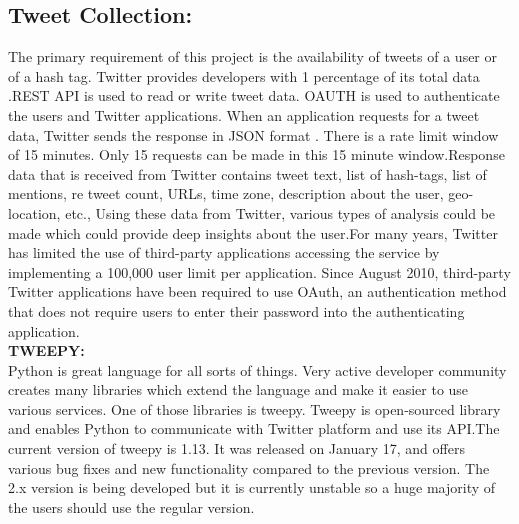 \subsection{Tweet Collection:}
The primary requirement of this project is the availability of tweets of a user or of a hash tag. Twitter provides developers with 1 percentage of its total data .REST API is used to read or write tweet data. OAUTH is used to authenticate the users
and Twitter applications. When an application requests for a tweet data, Twitter sends the
response in JSON format . There is a rate limit window of 15 minutes. Only 15 requests
can be made in this 15 minute window.Response data that is received from Twitter contains tweet text, list of hash-tags, list of
mentions, re tweet count, URLs, time zone, description about the user, geo-location, etc.,
Using these data from Twitter, various types of analysis could be made which could
provide deep insights about the user.For many years, Twitter has limited the use of third-party applications accessing the service by implementing a 100,000 user limit per application. Since August 2010, third-party Twitter applications have been required to use OAuth, an authentication method that does not require users to enter their password into the authenticating application.
\\
\textbf{TWEEPY:}\\
Python is great language for all sorts of things. Very active developer community creates many libraries which extend the language and make it easier to use various services. One of those libraries is tweepy. Tweepy is open-sourced library and enables Python to communicate with Twitter platform and use its API.The current version of tweepy is 1.13. It was released on January 17, and offers various bug fixes and new functionality compared to the previous version. The 2.x version is being developed but it is currently unstable so a huge majority of the users should use the regular version.
